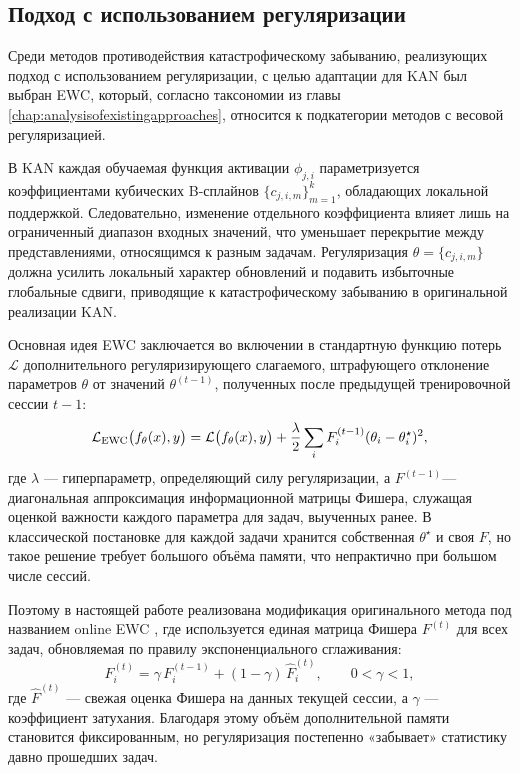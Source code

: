 \documentclass[a4paper,14pt]{extarticle}
\begin{document}
\subsection{Подход с использованием регуляризации}
Среди методов противодействия катастрофическому забыванию, реализующих подход с
использованием регуляризации, с целью адаптации для KAN был выбран EWC,
который, согласно таксономии из главы \ref{chap:analysisofexistingapproaches},
относится к подкатегории методов с весовой регуляризацией.

В KAN каждая обучаемая функция активации \(\phi_{j,i}\) параметризуется
коэффициентами кубических B-сплайнов
\(\{c_{j,i,m}\}_{m=1}^{k}\), обладающих локальной поддержкой.
Следовательно, изменение отдельного коэффициента влияет лишь на
ограниченный диапазон входных значений, что уменьшает перекрытие между
представлениями, относящимся к разным задачам. Регуляризация
\(\theta=\{c_{j,i,m}\}\) должна усилить локальный характер обновлений и подавить
избыточные глобальные сдвиги, приводящие к катастрофическому забыванию в
оригинальной реализации KAN.

Основная идея EWC заключается во включении в стандартную функцию потерь
\(\mathcal{L}\) дополнительного регуляризирующего слагаемого,
штрафующего отклонение параметров \(\theta\) от значений \(\theta^{(t-1)}\),
полученных после предыдущей тренировочной сессии \(t-1\):
\begin{equation}
    \mathcal{L}_{\mathrm{EWC}}\bigl(f_\theta(x),y\bigr)\\
    =\mathcal{L}\bigl(f_\theta(x),y\bigr)\\
    +\frac{\lambda}{2}\sum_{i}F^{(t-1)}_{i}(\theta_{i}-\theta^{\star}_{i})^{2},
\end{equation}
где \(\lambda\) — гиперпараметр, определяющий силу регуляризации, а
\(F^{(t-1)}\)— диагональная аппроксимация информационной матрицы Фишера,
служащая оценкой важности каждого параметра для задач, выученных ранее.  
В классической постановке для каждой задачи хранится собственная
\(\theta^{\star}\) и своя \(F\), но такое решение требует большого объёма памяти,
что непрактично при большом числе сессий.

Поэтому в настоящей работе реализована модификация оригинального метода под
названием online EWC \cite{schwarz2018progress}, где используется единая матрица
Фишера \(F^{(t)}\) для всех задач, обновляемая по правилу экспоненциального
сглаживания:
\begin{equation}
    F^{(t)}_i=\gamma\,F^{(t-1)}_i+(1-\gamma)\,\hat F^{(t)}_i,\qquad
    0<\gamma<1,
\end{equation}
где \(\hat F^{(t)}\) — свежая оценка Фишера на данных текущей
сессии, а \(\gamma\) — коэффициент затухания.  
Благодаря этому объём дополнительной памяти становится фиксированным, но регуляризация
постепенно «забывает» статистику давно прошедших задач.
\end{document}
